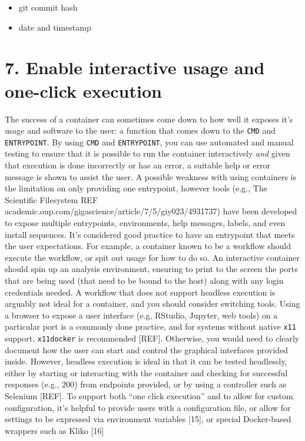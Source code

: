 \documentclass[10pt,letterpaper]{article}
\providecommand{\tightlist}{%
  \setlength{\itemsep}{0pt}\setlength{\parskip}{0pt}}
\begin{document}
\begin{itemize}
\tightlist
\item
  git commit hash
\item
  date and timestamp
\end{itemize}

\hypertarget{enable-interactive-usage-and-one-click-execution}{%
\section*{7. Enable interactive usage and one-click
execution}\label{enable-interactive-usage-and-one-click-execution}}

The success of a container can sometimes come down to how well it
exposes it's usage and software to the user: a function that comes down
to the \texttt{CMD} and \texttt{ENTRYPOINT}. By using \texttt{CMD} and
\texttt{ENTRYPOINT}, you can use automated and manual testing to ensure
that it is possible to run the container interactively \emph{and} given
that execution is done incorrectly or has an error, a suitable help or
error message is shown to assist the user. A possible weakness with
using containers is the limitation on only providing one entrypoint,
however tools (e.g., The Scientific Filesystem REF
academic.oup.com/gigascience/article/7/5/giy023/4931737) have been
developed to expose multiple entrypoints, environments, help messages,
labels, and even install sequences. It's considered good practice to
have an entrypoint that meets the user expectations. For example, a
container known to be a workflow should execute the workflow, or spit
out usage for how to do so. An interactive container should spin up an
analysis environment, ensuring to print to the screen the ports that are
being used (that need to be bound to the host) along with any login
credentials needed. A workflow that does not support headless execution
is arguably not ideal for a container, and you should consider switching
tools. Using a browser to expose a user interface (e.g, RStudio,
Jupyter, web tools) on a particular port is a commonly done practice,
and for systems without native \texttt{x11} support, \texttt{x11docker}
is recommended {[}REF{]}. Otherwise, you would need to clearly document
how the user can start and control the graphical interfaces provided
inside. However, headless execution is ideal in that it can be tested
headlessly, either by starting or interacting with the container and
checking for successful responses (e.g., 200) from endpoints provided,
or by using a controller such as Selenium {[}REF{]}. To support both
``one click execution'' and to allow for custom configuration, it's
helpful to provide users with a configuration file, or allow for
settings to be expressed via environment variables {[}15{]}, or special
Docker-based wrappers such as Kliko {[}16{]}
\end{document}
